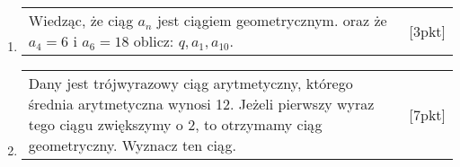 \documentclass[12pt,a4paper]{article}
\begin{document}
\begin{enumerate}[1.]
		\item \begin{tabular}{p{13cm} r}
			 Wiedząc, że ciąg $a_n$ jest ciągiem geometrycznym. oraz że $a_4=6$ i $a_6=18$ oblicz: $q,a_1,a_{10}$. &[3pkt]\\ 
		\end{tabular}
	
		\item \begin{tabular}{p{13cm} r}
			Dany jest trójwyrazowy ciąg arytmetyczny, którego średnia arytmetyczna wynosi 12. Jeżeli pierwszy wyraz tego ciągu zwiększymy o 2, to otrzymamy ciąg geometryczny. Wyznacz ten ciąg. &[7pkt]\\ 
		\end{tabular}

	\end{enumerate}

\newpage
\end{document}
